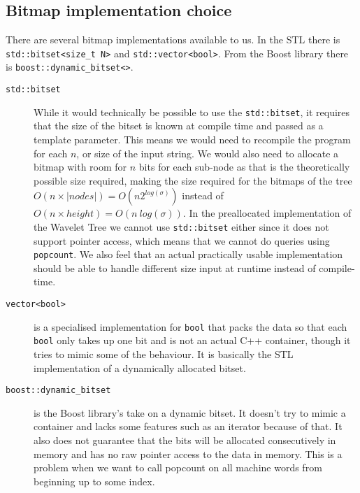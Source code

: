 \subsection{Bitmap implementation choice}
There are several bitmap implementations available to us. In the STL there is \texttt{std::bitset<size\_t N>} and \texttt{std::vector<bool>}. From the Boost library there is \texttt{boost::dynamic\_bitset<>}.
\begin{description}
\item[\texttt{std::bitset}] While it would technically be possible to use the \texttt{std::bitset}, it requires that the size of the bitset is known at compile time and passed as a template parameter. This means we would need to recompile the program for each $n$, or size of the input string. 
We would also need to allocate a bitmap with room for $n$ bits for each sub-node as that is the theoretically possible size required, making the size required for the bitmaps of the tree $O(n \times |nodes|) = O(n2^{log(\sigma)})$ instead of $O(n \times height) = O(n~log(\sigma))$.
In the preallocated implementation of the Wavelet Tree we cannot use \texttt{std::bitset} either since it does not support pointer access, which means that we cannot do queries using \texttt{popcount}.
We also feel that an actual practically usable implementation should be able to handle different size input at runtime instead of compile-time. 

\item[\texttt{vector<bool>}] is a specialised implementation for \texttt{bool} that packs the data so that each \texttt{bool} only takes up one bit and is not an actual C++ container, though it tries to mimic some of the behaviour. 
It is basically the STL implementation of a dynamically allocated bitset.

\item[\texttt{boost::dynamic\_bitset}] is the Boost library's take on a dynamic bitset. 
It doesn't try to mimic a container and lacks some features such as an iterator because of that. 
It also does not guarantee that the bits will be allocated consecutively in memory and has no raw pointer access to the data in memory. 
This is a problem when we want to call popcount on all machine words from beginning up to some index.
\end{description}
